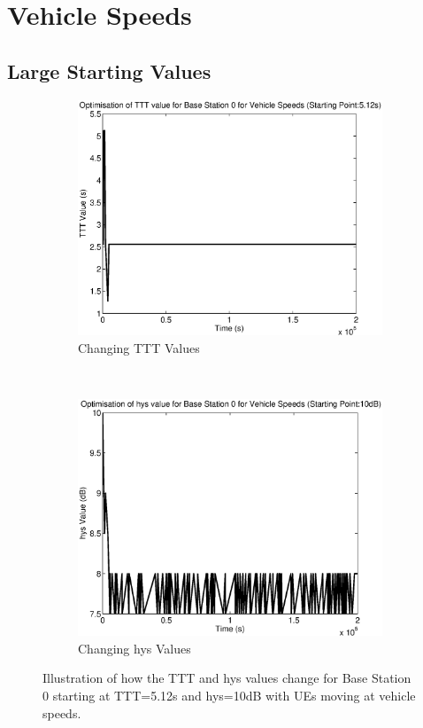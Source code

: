 \section{Vehicle Speeds}\label{ap:veh}
\subsection{Large Starting Values}\label{ap:veh_large}
\begin{figure}[H]
        \centering
        \begin{subfigure}[b]{0.49\textwidth}
                \includegraphics[width=\textwidth]{figures/graphs/vehhigh/TTT0.eps}
                \caption{Changing TTT Values}
        \end{subfigure}%
        ~ %
        \begin{subfigure}[b]{0.49\textwidth}
                \includegraphics[width=\textwidth]{figures/graphs/vehhigh/hys0.eps}
                \caption{Changing hys Values}
        \end{subfigure}
        \caption{Illustration of how the TTT and hys values change for Base Station 0 starting at TTT=5.12s and hys=10dB with UEs moving at vehicle speeds.}
\end{figure}
